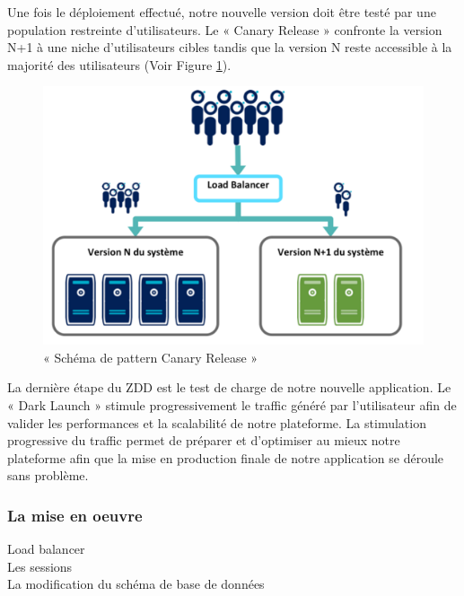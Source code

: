 \documentclass{report}
\begin{document}
          Une fois le déploiement effectué, notre nouvelle version doit être testé par une population restreinte d’utilisateurs. Le « Canary Release » confronte la version N+1 à une niche d’utilisateurs cibles tandis que la version N reste accessible à la majorité des utilisateurs (Voir Figure \ref{CanaryRelease}).\\

          \begin{figure}
            \begin{center}
              \includegraphics[scale=0.6]{images/CanaryRelease.png}
            \end{center}
            \caption{« Schéma de pattern Canary Release »}
            \label{CanaryRelease}
          \end{figure}

          La dernière étape du ZDD est le test de charge de notre nouvelle application. Le « Dark Launch » stimule progressivement le traffic généré par l’utilisateur afin de valider les performances et la scalabilité de notre plateforme. La stimulation progressive du traffic permet de préparer et d’optimiser au mieux notre plateforme afin que la mise en production finale de notre application se déroule sans problème.

          \subsubsection{La mise en oeuvre}
          Load balancer\\

          Les sessions\\

          La modification du schéma de base de données\\
\end{document}
